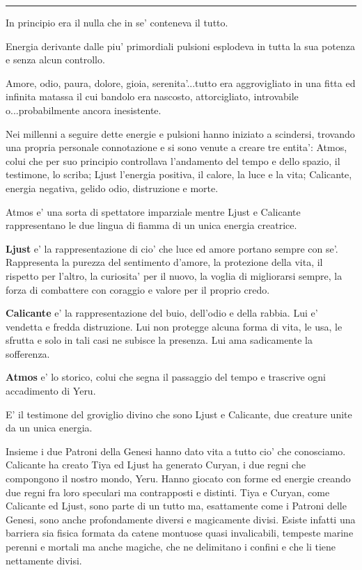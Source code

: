 \documentclass[a4paper,11pt,twoside,openany]{book}
\begin{document}
{\noindent\rule{\textwidth}{1pt}

\bigskip

In principio era il nulla che in se' conteneva il tutto.

Energia derivante dalle piu' primordiali pulsioni esplodeva in tutta la sua potenza e senza alcun controllo.

Amore, odio, paura, dolore, gioia, serenita'...tutto era aggrovigliato in una fitta ed infinita matassa il cui bandolo era nascosto, attorcigliato, introvabile o...probabilmente ancora inesistente.

Nei millenni a seguire dette energie e pulsioni hanno iniziato a scindersi, trovando una propria personale connotazione e si sono venute a creare tre entita': Atmos, colui che per suo principio controllava l'andamento del tempo e dello spazio, il testimone, lo scriba; Ljust l'energia positiva, il calore, la luce e la vita; Calicante, energia negativa, gelido odio, distruzione e morte.

Atmos e' una sorta di spettatore imparziale mentre Ljust e Calicante rappresentano le due lingua di fiamma di un unica energia creatrice.

\textbf{Ljust} e' la rappresentazione di cio' che luce ed amore portano sempre con se'. Rappresenta la purezza del sentimento d'amore, la protezione della vita, il rispetto per l'altro, la curiosita' per il nuovo, la voglia di migliorarsi sempre, la forza di combattere con coraggio e valore per il proprio credo.

\textbf{Calicante} e' la rappresentazione del buio, dell'odio e della rabbia. Lui e' vendetta e fredda distruzione. Lui non protegge alcuna forma di vita, le usa, le sfrutta e solo in tali casi ne subisce la presenza. Lui ama sadicamente la sofferenza. 
 
\textbf{Atmos} e' lo storico, colui che segna il passaggio del tempo e trascrive ogni accadimento di Yeru.

E' il testimone del groviglio divino che sono Ljust e Calicante, due creature unite da un unica energia.

Insieme i due Patroni della Genesi hanno dato vita a tutto cio' che conosciamo. Calicante ha creato Tiya ed Ljust ha generato Curyan, i due regni che compongono il nostro mondo, Yeru. Hanno giocato con forme ed energie creando due regni fra loro speculari ma contrapposti e distinti. Tiya e Curyan, come Calicante ed Ljust, sono parte di un tutto ma, esattamente come i Patroni delle Genesi, sono anche profondamente diversi e magicamente divisi. Esiste infatti una barriera sia fisica formata da catene montuose quasi invalicabili, tempeste marine perenni e mortali ma anche magiche, che ne delimitano i confini e che li tiene nettamente divisi.

}
\end{document}
